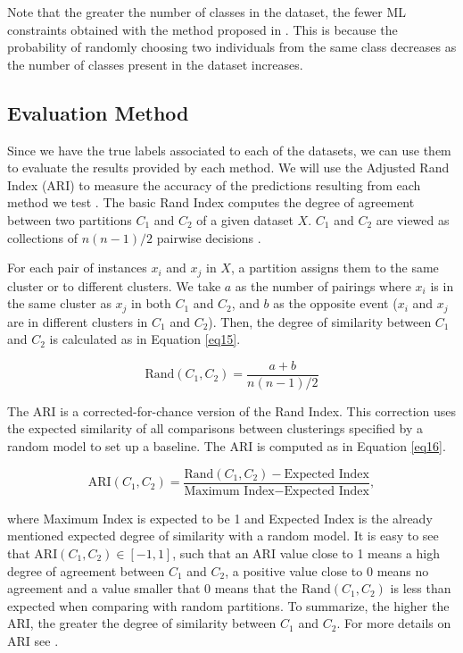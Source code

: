 \documentclass[review]{elsarticle}
\begin{document}
Note that the greater the number of classes in the dataset, the fewer ML constraints obtained with the method proposed in \cite{wagstaff2001constrained}. This is because the probability of randomly choosing two individuals from the same class decreases as the number of classes present in the dataset increases.

\clearpage

\subsection{Evaluation Method} \label{sec:EvalMet}

Since we have the true labels associated to each of the datasets, we can use them to evaluate the results provided by each method. We will use the Adjusted Rand Index (ARI) to measure the accuracy of the predictions resulting from each method we test \cite{hubert1985comparing}. The basic Rand Index computes the degree of agreement between two partitions $C_1$ and $C_2$ of a given dataset $X$. $C_1$ and $C_2$ are viewed as collections of $n(n - 1)/2$ pairwise decisions \cite{rand1971objective}.

For each pair of instances $x_i$ and $x_j$ in $X$, a partition assigns them to the same cluster or to different clusters. We take $a$ as the number of pairings where $x_i$ is in the same cluster as $x_j$ in both $C_1$ and $C_2$, and $b$ as the opposite event ($x_i$ and $x_j$ are in different clusters in $C_1$ and $C_2$). Then, the degree of similarity between $C_1$ and $C_2$ is calculated as in Equation \eqref{eq15}.

\begin{equation}
\text{Rand}(C_1, C_2) = \frac{a + b}{n(n - 1)/2}
\label{eq15}
\end{equation}

The ARI is a corrected-for-chance version of the Rand Index. This correction uses the expected similarity of all comparisons between clusterings specified by a random model to set up a baseline. The ARI is computed as in Equation \eqref{eq16}.

\begin{equation}
\text{ARI}(C_1, C_2) = \frac{\text{Rand}(C_1, C_2) - \text{Expected Index}}{\text{Maximum Index} - \text{Expected Index}},
\label{eq16}
\end{equation}

\noindent where Maximum Index is expected to be 1 and Expected Index is the already mentioned expected degree of similarity with a random model. It is easy to see that $\text{ARI}(C_1, C_2) \in [-1,1]$, such that an ARI value close to 1 means a high degree of agreement between $C_1$ and $C_2$, a positive value close to 0 means no agreement and a value smaller that 0 means that the $\text{Rand}(C_1, C_2)$ is less than expected when comparing with random partitions. To summarize, the higher the ARI, the greater the degree of similarity between $C_1$ and $C_2$. For more details on ARI see \cite{hubert1985comparing}.
\end{document}
